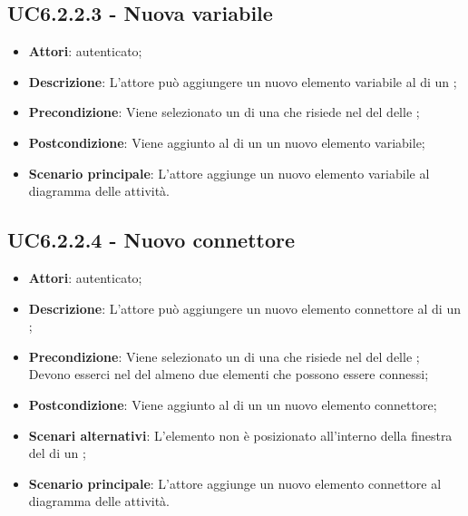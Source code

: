 \subsection{UC6.2.2.3 - Nuova variabile}
\label{ssec:UC6.2.2.3}
\begin{itemize}
\item \textbf{Attori}:  autenticato;
\item \textbf{Descrizione}: L'attore può aggiungere un nuovo elemento variabile al  di un ;
\item \textbf{Precondizione}: Viene selezionato un  di una  che risiede nel  del  delle  ;
\item \textbf{Postcondizione}: Viene aggiunto al  di un  un nuovo elemento variabile;
\item \textbf{Scenario principale}: L'attore aggiunge un nuovo elemento variabile al diagramma delle attività.
\end{itemize}
\subsection{UC6.2.2.4 - Nuovo connettore}
\label{ssec:UC6.2.2.4}
\begin{itemize}
\item \textbf{Attori}:  autenticato;
\item \textbf{Descrizione}: L'attore può aggiungere un nuovo elemento connettore al  di un ;
\item \textbf{Precondizione}: Viene selezionato un  di una  che risiede nel  del  delle  ; Devono esserci nel  del  almeno due elementi che possono essere connessi;
\item \textbf{Postcondizione}: Viene aggiunto al  di un  un nuovo elemento connettore;
\item \textbf{Scenari alternativi}: L'elemento non è posizionato all'interno della finestra del  di un ;
\item \textbf{Scenario principale}: L'attore aggiunge un nuovo elemento connettore al diagramma delle attività.
\end{itemize}
